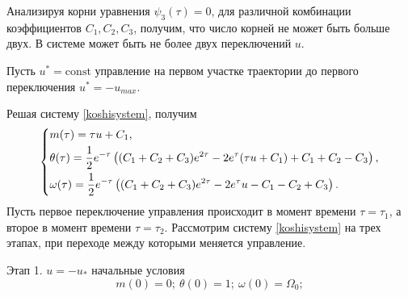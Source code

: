 \documentclass[a4paper,14pt]{article}
\theoremstyle{plain} %
\theoremstyle{definition} %
\theoremstyle{remark} %
\begin{document}
{Анализируя корни уравнения $\psi_3(\tau)=0$, для различной комбинации
коэффициентов $C_1,C_2,C_3$, получим, что число корней не может быть больше двух. В системе может быть не более двух переключений $u$.

Пусть $u^*=\mathrm{const}$ управление на первом участке траектории до первого переключения $u^*=-u_{max}$.

Решая систему \eqref{koshisystem}, получим
\begin{equation}\label{solvekoshi}
    \left\{ {\begin{aligned}
                 & m(\tau) = \tau u+C_1, \hfill                                                            \\
                 & \theta(\tau) = \frac{1}{2} e^{-\tau } \left((C_1+C_2+C_3) e^{2 \tau }-2 e^{\tau } (\tau
                u+C_1)+C_1+C_2-C_3\right), \hfill                                                          \\
                 & \omega(\tau) = \frac{1}{2} e^{-\tau } \left((C_1+C_2+C_3) e^{2 \tau }-2 e^{\tau }
                u-C_1-C_2+C_3\right). \hfill                                                               \\
            \end{aligned}} \right.
\end{equation}
\newpage
Пусть первое переключение управления происходит в момент времени
$\tau=\tau_1$, а второе в момент времени
$\tau=\tau_2$. Рассмотрим систему \eqref{koshisystem} на трех этапах,
при переходе между которыми меняется управление.

Этап 1. $u=-u_*$ начальные условия
\[
    m(0)=0;\ \theta(0)=1;\ \omega(0)=\Omega_0;
\]

}
\end{document}
